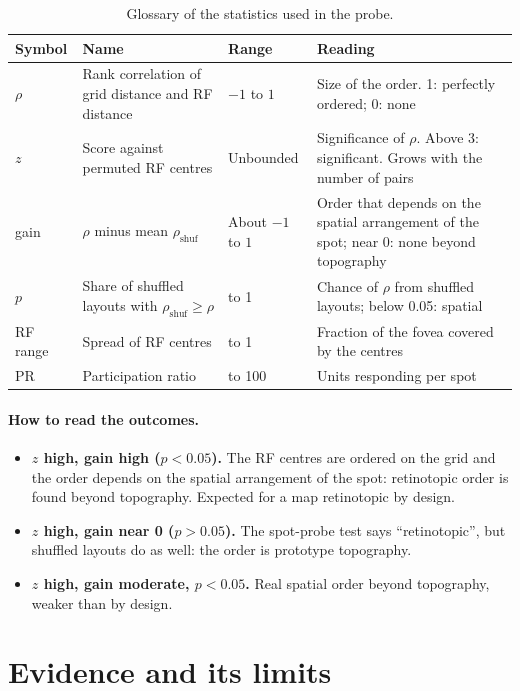\documentclass[11pt,a4paper]{article}
\newcommand{\ra}{\raggedright\arraybackslash}
\begin{document}
\begin{table}[h]
\centering\footnotesize
\setlength{\tabcolsep}{3pt}
\begin{tabular}{@{}>{\ra}p{1.6cm}>{\ra}p{3.7cm}>{\ra}p{3.0cm}>{\ra}p{6.1cm}@{}}
\toprule
Symbol & Name & Range & Reading \\
\midrule
$\rho$ & Rank correlation of grid distance and RF distance & $-1$ to $1$ & Size of the order. 1: perfectly ordered; 0: none \\
$z$ & Score against permuted RF centres & Unbounded & Significance of $\rho$. Above 3: significant. Grows with the number of pairs \\
gain & $\rho$ minus mean $\rho_{\mathrm{shuf}}$ & About $-1$ to $1$ & Order that depends on the spatial arrangement of the spot; near 0: none beyond topography \\
$p$ & Share of shuffled layouts with $\rho_{\mathrm{shuf}}\ge\rho$ & 0.01 to 1 & Chance of $\rho$ from shuffled layouts; below 0.05: spatial \\
RF range & Spread of RF centres & 0 to 1 & Fraction of the fovea covered by the centres \\
PR & Participation ratio & 1 to 100 & Units responding per spot \\
\bottomrule
\end{tabular}
\caption{Glossary of the statistics used in the probe.}
\label{tab:glossary}
\end{table}

\paragraph{How to read the outcomes.}
\begin{itemize}[nosep]
  \item \textbf{$z$ high, gain high ($p<0.05$).} The RF centres are ordered on the
    grid and the order depends on the spatial arrangement of the spot: retinotopic
    order is found beyond topography. Expected for a map retinotopic by design.
  \item \textbf{$z$ high, gain near 0 ($p>0.05$).} The spot-probe test says
    ``retinotopic'', but shuffled layouts do as well: the order is prototype
    topography.
  \item \textbf{$z$ high, gain moderate, $p<0.05$.} Real spatial order beyond
    topography, weaker than by design.
\end{itemize}

\section{Evidence and its limits}
\end{document}
